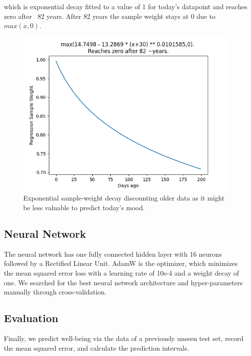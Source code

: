 \documentclass[conference]{IEEEtran}
\begin{document}
which is exponential decay fitted to a value of 1 for today's datapoint and reaches zero after ~82 years. After 82 years the sample weight stays at 0 due to $max(x,0)$.
\begin{figure}[htbp]
\begin{center}
\includegraphics[width=1\linewidth]{figs/RegressionSampleWeight.png}
\caption[Sample weight]{Exponential sample-weight decay discounting older data as it might be less valuable to predict today's mood.}
\label{fig:sample-weight}
\end{center}
\end{figure}


\subsection{Neural Network}
The neural network has one fully connected hidden layer with 16 neurons followed by a Rectified Linear Unit. AdamW is the optimizer, which minimizes the mean squared error loss with a learning rate of 10e-4 and a weight decay of one. 
We searched for the best neural network architecture and hyper-parameters manually through cross-validation.


\subsection{Evaluation}
Finally, we predict well-being via the data of a previously unseen test set, record the mean squared error, and calculate the prediction intervals.

\end{document}
